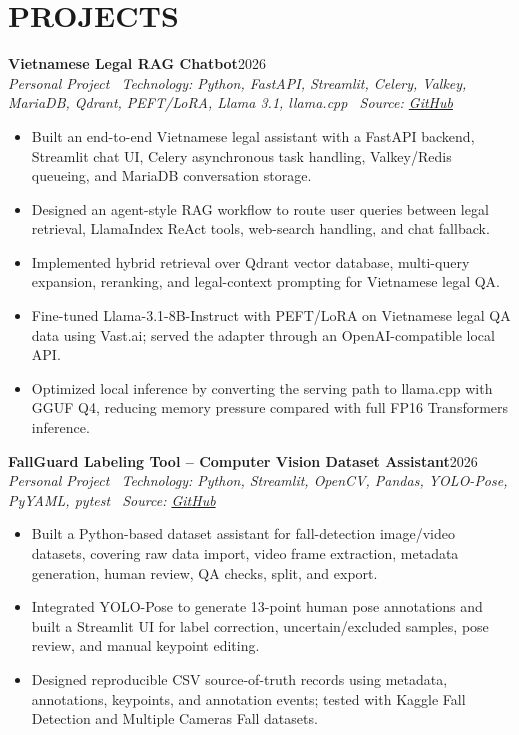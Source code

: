 \documentclass[10pt,a4paper]{article}
\newenvironment{cvitems}{%
    \begin{itemize}[leftmargin=1.25em,itemsep=0pt,topsep=1pt,parsep=0pt]
}{%
    \end{itemize}
}
\newcommand{\entryhead}[2]{%
    \noindent\textbf{#1}\hfill #2\\[-2pt]
}
\newcommand{\entrysub}[1]{%
    \noindent\textit{#1}\\[-1pt]
}
\begin{document}
\section{PROJECTS}
\entryhead{Vietnamese Legal RAG Chatbot}{2026}
\entrysub{Personal Project \textbar\ Technology: Python, FastAPI, Streamlit, Celery, Valkey, MariaDB, Qdrant, PEFT/LoRA, Llama 3.1, llama.cpp \textbar\ Source: \href{https://github.com/NguyenKhacBao564/legal_RaG_Chatbot_VietNamese-System}{GitHub}}
\begin{cvitems}
    \item Built an end-to-end Vietnamese legal assistant with a FastAPI backend, Streamlit chat UI, Celery asynchronous task handling, Valkey/Redis queueing, and MariaDB conversation storage.
    \item Designed an agent-style RAG workflow to route user queries between legal retrieval, LlamaIndex ReAct tools, web-search handling, and chat fallback.
    \item Implemented hybrid retrieval over Qdrant vector database, multi-query expansion, reranking, and legal-context prompting for Vietnamese legal QA.
    \item Fine-tuned Llama-3.1-8B-Instruct with PEFT/LoRA on Vietnamese legal QA data using Vast.ai; served the adapter through an OpenAI-compatible local API.
    \item Optimized local inference by converting the serving path to llama.cpp with GGUF Q4, reducing memory pressure compared with full FP16 Transformers inference.
\end{cvitems}

\entryhead{FallGuard Labeling Tool -- Computer Vision Dataset Assistant}{2026}
\entrysub{Personal Project \textbar\ Technology: Python, Streamlit, OpenCV, Pandas, YOLO-Pose, PyYAML, pytest \textbar\ Source: \href{https://github.com/NguyenKhacBao564/autofall-labeler-tool}{GitHub}}
\begin{cvitems}
    \item Built a Python-based dataset assistant for fall-detection image/video datasets, covering raw data import, video frame extraction, metadata generation, human review, QA checks, split, and export.
    \item Integrated YOLO-Pose to generate 13-point human pose annotations and built a Streamlit UI for label correction, uncertain/excluded samples, pose review, and manual keypoint editing.
    \item Designed reproducible CSV source-of-truth records using metadata, annotations, keypoints, and annotation events; tested with Kaggle Fall Detection and Multiple Cameras Fall datasets.
\end{cvitems}
\end{document}
